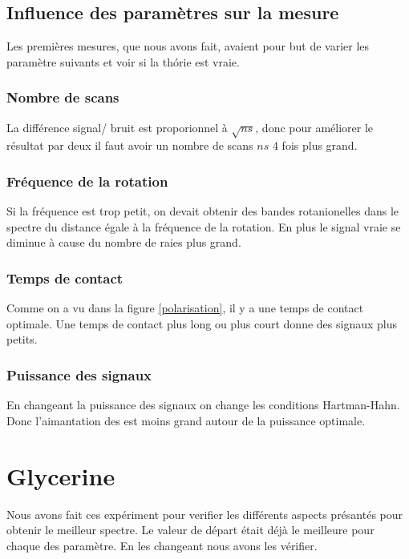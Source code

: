 \documentclass[a4paper,12pt]{scrartcl}
\begin{document}
   \subsection{Influence des paramètres sur la mesure}
    Les premières mesures, que nous avons fait, avaient pour but de varier les paramètre suivants et voir si la thórie est vraie.
    \subsubsection{Nombre de scans}
     La différence signal/ bruit est proporionnel à $\sqrt{ns}$, donc pour améliorer le résultat par deux il faut avoir un nombre de scans $ns$ 4 fois plus grand.

    \subsubsection{Fréquence de la rotation}
     Si la fréquence est trop petit, on devait obtenir des bandes rotanionelles dans le spectre du distance égale à la fréquence de la rotation. En plus le signal vraie se diminue à cause du nombre de raies plus grand.

    \subsubsection{Temps de contact}
     Comme on a vu dans la figure \ref{polarisation}, il y a une temps de contact optimale. Une temps de contact plus long ou plus court donne des signaux plus petits.

    \subsubsection{Puissance des signaux}
     En changeant la puissance des signaux on change les conditions Hartman-Hahn. Donc l'aimantation des  est moins grand autour de la puissance optimale.

 \section{Glycerine}
  Nous avons fait ces expériment pour verifier les différents aspects présantés pour obtenir le meilleur spectre. Le valeur de départ était déjà le meilleure pour chaque des paramètre. En les changeant nous avons les vérifier.   
\end{document}
